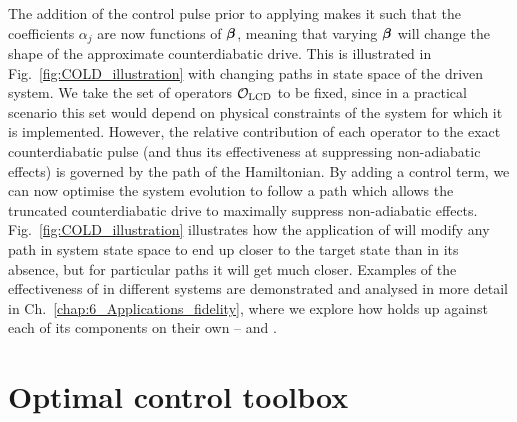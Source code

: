 The addition of the control pulse prior to applying  makes it such that the  coefficients $\alpha_j$ are now functions of $\boldsymbol{\beta}$, meaning that varying $\boldsymbol{\beta}$ will change the shape of the approximate counterdiabatic drive. This is illustrated in Fig.~\ref{fig:COLD_illustration} with changing paths in state space of the driven system. We take the set of operators $\mathcal{O}_{\rm LCD}$ to be fixed, since in a practical scenario this set would depend on physical constraints of the system for which it is implemented. However, the relative contribution of each operator to the exact counterdiabatic pulse (and thus its effectiveness at suppressing non-adiabatic effects) is governed by the path of the Hamiltonian. By adding a control term, we can now optimise the system evolution to follow a path which allows the truncated counterdiabatic drive to maximally suppress non-adiabatic effects. Fig.~\ref{fig:COLD_illustration} illustrates how the application of  will modify any path in system state space to end up closer to the target state than in its absence, but for particular paths it will get much closer. Examples of the effectiveness of  in different systems are demonstrated and analysed in more detail in Ch.~\ref{chap:6_Applications_fidelity}, where we explore how  holds up against each of its components on their own --  and .

\section{Optimal control toolbox}\label{sec:4.2_COLD_QOCT}

